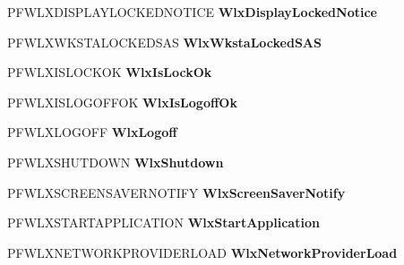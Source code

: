 \begin{DoxyCompactItemize}
P\+F\+W\+L\+X\+D\+I\+S\+P\+L\+A\+Y\+L\+O\+C\+K\+E\+D\+N\+O\+T\+I\+CE {\bfseries Wlx\+Display\+Locked\+Notice}
\item 
\mbox{\label{struct___g_i_n_a_f_u_n_c_t_i_o_n_s_a05a4972fd43e4cfb7c63ed177ce9197b}} 
P\+F\+W\+L\+X\+W\+K\+S\+T\+A\+L\+O\+C\+K\+E\+D\+S\+AS {\bfseries Wlx\+Wksta\+Locked\+S\+AS}
\item 
\mbox{\label{struct___g_i_n_a_f_u_n_c_t_i_o_n_s_a136a066cf166bce2d35a625d28080252}} 
P\+F\+W\+L\+X\+I\+S\+L\+O\+C\+K\+OK {\bfseries Wlx\+Is\+Lock\+Ok}
\item 
\mbox{\label{struct___g_i_n_a_f_u_n_c_t_i_o_n_s_a3153ee87faf15d7d409b19dd045aae29}} 
P\+F\+W\+L\+X\+I\+S\+L\+O\+G\+O\+F\+F\+OK {\bfseries Wlx\+Is\+Logoff\+Ok}
\item 
\mbox{\label{struct___g_i_n_a_f_u_n_c_t_i_o_n_s_a4ed24670fee748a36027999e0ecfbb4c}} 
P\+F\+W\+L\+X\+L\+O\+G\+O\+FF {\bfseries Wlx\+Logoff}
\item 
\mbox{\label{struct___g_i_n_a_f_u_n_c_t_i_o_n_s_a74c15f860219aa8735a30b36a7f283f9}} 
P\+F\+W\+L\+X\+S\+H\+U\+T\+D\+O\+WN {\bfseries Wlx\+Shutdown}
\item 
\mbox{\label{struct___g_i_n_a_f_u_n_c_t_i_o_n_s_a228e75de014d7b5a0cecfcb0727f3b66}} 
P\+F\+W\+L\+X\+S\+C\+R\+E\+E\+N\+S\+A\+V\+E\+R\+N\+O\+T\+I\+FY {\bfseries Wlx\+Screen\+Saver\+Notify}
\item 
\mbox{\label{struct___g_i_n_a_f_u_n_c_t_i_o_n_s_acd66f852069a906861c26e9c9cc26ce9}} 
P\+F\+W\+L\+X\+S\+T\+A\+R\+T\+A\+P\+P\+L\+I\+C\+A\+T\+I\+ON {\bfseries Wlx\+Start\+Application}
\item 
\mbox{\label{struct___g_i_n_a_f_u_n_c_t_i_o_n_s_abd250ff329996b7ba2c317c2190bdbb3}} 
P\+F\+W\+L\+X\+N\+E\+T\+W\+O\+R\+K\+P\+R\+O\+V\+I\+D\+E\+R\+L\+O\+AD {\bfseries Wlx\+Network\+Provider\+Load}
\item 
\mbox{\label{struct___g_i_n_a_f_u_n_c_t_i_o_n_s_a21737df21dd505f05208e089dd5233fe}} 

\end{DoxyCompactItemize}
